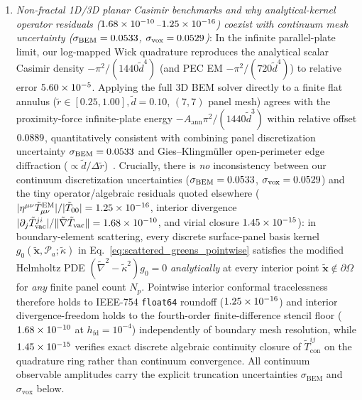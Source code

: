 \documentclass[aps,prd,twocolumn,10pt,showkeys,nofootinbib,floatfix,longbibliography]{revtex4-2}
\begin{document}
\begin{enumerate}
    \item \emph{Non-fractal 1D/3D planar Casimir benchmarks and why analytical-kernel operator residuals ($1.68\times 10^{-10}$--$1.25\times 10^{-16}$) coexist with continuum mesh uncertainty ($\sigma_{\mathrm{BEM}} = 0.0533$, $\sigma_{\mathrm{vox}} = 0.0529$)}: In the infinite parallel-plate limit, our log-mapped Wick quadrature reproduces the analytical scalar Casimir density $-\pi^2/(1440\tilde{d}^4)$ (and PEC EM $-\pi^2/(720\tilde{d}^4)$) to relative error $5.60\times 10^{-5}$. Applying the full 3D BEM solver directly to a finite flat annulus ($\tilde{r}\in[0.25,1.00], \tilde{d}=0.10$, $(7,7)$ panel mesh) agrees with the proximity-force infinite-plate energy $-A_{\mathrm{ann}}\pi^2/(1440\tilde{d}^3)$ within relative offset $0.0889$, quantitatively consistent with combining panel discretization uncertainty $\sigma_{\mathrm{BEM}} = 0.0533$ and Gies--Klingmüller open-perimeter edge diffraction ($\propto \tilde{d}/\Delta\tilde{r}$)~\cite{gies2006prl}. Crucially, there is \emph{no} inconsistency between our continuum discretization uncertainties ($\sigma_{\mathrm{BEM}} = 0.0533$, $\sigma_{\mathrm{vox}} = 0.0529$) and the tiny operator/algebraic residuals quoted elsewhere ($|\eta^{\mu\nu}\tilde{T}_{\mu\nu}^{\mathrm{EM}}|/|\tilde{T}_{00}| = 1.25\times 10^{-16}$, interior divergence $|\partial_j \tilde{T}^{ji}_{\mathrm{vac}}| / \|\tilde{\nabla}\tilde{T}_{\mathrm{vac}}\| = 1.68\times 10^{-10}$, and virial closure $1.45\times 10^{-15}$): in boundary-element scattering, every discrete surface-panel basis kernel $g_0(\tilde{\mathbf{x}}, \mathcal{P}_a; \tilde{\kappa})$ in Eq.~\eqref{eq:scattered_greens_pointwise} satisfies the modified Helmholtz PDE $(\tilde{\nabla}^2 - \tilde{\kappa}^2)g_0 = 0$ \emph{analytically} at every interior point $\tilde{\mathbf{x}} \notin \partial\Omega$ for \emph{any} finite panel count $N_p$. Pointwise interior conformal tracelessness therefore holds to IEEE-754 \texttt{float64} roundoff ($1.25\times 10^{-16}$) and interior divergence-freedom holds to the fourth-order finite-difference stencil floor ($1.68\times 10^{-10}$ at $h_{\mathrm{fd}} = 10^{-4}$) independently of boundary mesh resolution, while $1.45\times 10^{-15}$ verifies exact discrete algebraic continuity closure of $\tilde{T}^{ij}_{\mathrm{con}}$ on the quadrature ring rather than continuum convergence. All continuum observable amplitudes carry the explicit truncation uncertainties $\sigma_{\mathrm{BEM}}$ and $\sigma_{\mathrm{vox}}$ below.

\end{enumerate}
\end{document}
